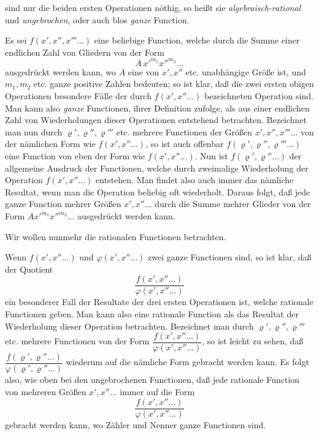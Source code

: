\documentclass{article}
\begin{document}
sind nur die beiden ersten Operationen nöthig, so heißt sie \emph{algebraisch-rational} und \emph{ungebrochen}, oder auch blos \emph{ganze} Function.

Es sei $f(x', x'', x''' \ldots)$ eine beliebige Function, welche durch die Summe einer endlichen Zahl von Gliedern von der Form
\[ A\,x'^{m_1} x''^{m_2} \ldots \]
ausgedrückt werden kann, wo $A$ eine von $x', x''$ etc. unabhängige Größe ist, und $m_1, m_2$ etc. ganze positive Zahlen bedeuten; so ist klar, daß die zwei ersten obigen Operationen besondere Fälle der durch $f(x', x'' \ldots)$ bezeichneten Operation sind. Man kann also \emph{ganze} Functionen, ihrer Definition zufolge, als aus einer endlichen Zahl von Wiederholungen dieser Operationen entstehend betrachten. Bezeichnet man nun durch $\varrho', \varrho'', \varrho''' $ etc. mehrere Functionen der Größen $x', x'', x''' \ldots$ von der nämlichen Form wie $f(x', x'' \ldots)$, so ist auch offenbar $f(\varrho', \varrho'', \varrho''' \ldots)$ eine Function von eben der Form wie $f(x', x'' \ldots)$. Nun ist $f(\varrho', \varrho'' \ldots)$ der allgemeine Ausdruck der Functionen, welche durch zweimalige Wiederholung der Operation $f(x', x'' \ldots)$ entstehen. Man findet also auch immer das nämliche Resultat, wenn man die Operation beliebig oft wiederholt. Daraus folgt, daß jede ganze Function mehrer Größen $x', x'' \ldots$ durch die Summe mehrer Glieder von der Form $A x'^{m_1} x''^{m_2} \ldots$ ausgedrückt werden kann.

Wir wollen nunmehr die rationalen Functionen betrachten.

Wenn $f(x', x'' \ldots)$ und $\varphi(x', x'' \ldots)$ zwei ganze Functionen sind, so ist klar, daß der Quotient
\[ \frac{f(x', x'' \ldots)}{\varphi(x', x'' \ldots)} \]
ein besonderer Fall der Resultate der drei ersten Operationen ist, welche rationale Functionen geben. Man kann also eine rationale Function als das Resultat der Wiederholung dieser Operation betrachten. Bezeichnet man durch $\varrho', \varrho'', \varrho''' $ etc. mehrere Functionen von der Form $\dfrac{f(x', x'' \ldots)}{\varphi(x', x'' \ldots)}$, so ist leicht zu sehen, daß $\dfrac{f(\varrho', \varrho'' \ldots)}{\varphi(\varrho', \varrho'' \ldots)}$ wiederum auf die nämliche Form gebracht werden kann. Es folgt also, wie oben bei den ungebrochenen Functionen, daß jede rationale Function von mehreren Größen $x', x'' \ldots$ immer auf die Form
\[ \frac{f(x', x'' \ldots)}{\varphi(x', x'' \ldots)} \]
gebracht werden kann, wo Zähler und Nenner ganze Functionen sind.
\end{document}
